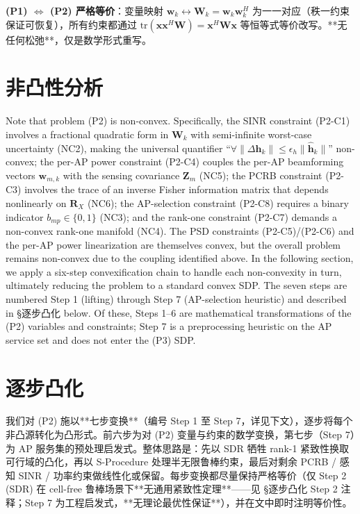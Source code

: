 \documentclass[12pt,a4paper]{article}
\newcommand{\vect}[1]{\mathbf{#1}}
\newcommand{\mat}[1]{\mathbf{#1}}
\newcommand{\tr}{\text{tr}}
\begin{document}
\textbf{(P1) $\Leftrightarrow$ (P2) 严格等价}：变量映射 $\vect{w}_k \leftrightarrow \mat{W}_k = \vect{w}_k \vect{w}_k^H$ 为一一对应（秩一约束保证可恢复），所有约束都通过 $\tr(\vect{x}\vect{x}^H \mat{W}) = \vect{x}^H \mat{W} \vect{x}$ 等恒等式等价改写。**无任何松弛**，仅是数学形式重写。

\section{非凸性分析}

Note that problem (P2) is non-convex. Specifically, the SINR constraint (P2-C1) involves a fractional quadratic form in $\mat{W}_k$ with semi-infinite worst-case uncertainty (NC2), making the universal quantifier ``$\forall \|\Delta\vect{h}_k\| \leq \epsilon_h \|\hat{\vect{h}}_k\|$'' non-convex; the per-AP power constraint (P2-C4) couples the per-AP beamforming vectors $\vect{w}_{m,k}$ with the sensing covariance $\mat{Z}_m$ (NC5); the PCRB constraint (P2-C3) involves the trace of an inverse Fisher information matrix that depends nonlinearly on $\mat{R}_X$ (NC6); the AP-selection constraint (P2-C8) requires a binary indicator $b_{mp} \in \{0,1\}$ (NC3); and the rank-one constraint (P2-C7) demands a non-convex rank-one manifold (NC4). The PSD constraints (P2-C5)/(P2-C6) and the per-AP power linearization are themselves convex, but the overall problem remains non-convex due to the coupling identified above. In the following section, we apply a six-step convexification chain to handle each non-convexity in turn, ultimately reducing the problem to a standard convex SDP. The seven steps
are numbered Step 1 (lifting) through Step 7 (AP-selection heuristic)
and described in §逐步凸化 below. Of these, Steps 1--6 are
mathematical transformations of the (P2) variables and constraints;
Step 7 is a preprocessing heuristic on the AP service set and does
not enter the (P3) SDP.

\section{逐步凸化}

我们对 (P2) 施以**七步变换**（编号 Step 1 至 Step 7，详见下文），逐步将每个非凸源转化为凸形式。前六步为对 (P2) 变量与约束的数学变换，第七步（Step 7）为 AP 服务集的预处理启发式。整体思路是：先以 SDR 牺牲 rank-1 紧致性换取可行域的凸化，再以 S-Procedure 处理半无限鲁棒约束，最后对剩余 PCRB / 感知 SINR / 功率约束做线性化或保留。每步变换都尽量保持严格等价（仅 Step 2 (SDR) 在 cell-free 鲁棒场景下**无通用紧致性定理**——见 §逐步凸化 Step 2 注释；Step 7 为工程启发式，**无理论最优性保证**），并在文中即时注明等价性。
\end{document}
